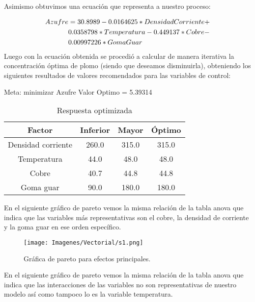 Asimismo obtuvimos una ecuaci\'on que representa a nuestro proceso:

\begin{equation}
 \begin{align}
  Azufre &= 30.8989 - 0.0164625*Densidad Corriente +\\
         &0.0358798*Temperatura - 0.449137*Cobre - \\
         &0.00997226*Goma Guar
               \notag
 \end{align}
\end{equation}
Luego con la ecuaci\'on obtenida se procedi\'o a calcular de manera iterativa la concentraci\'on \'optima de plomo (siendo que deseamos disminuirla), obteniendo los siguientes resultados de valores recomendados para las variables de control:

Meta: minimizar Azufre \phantom{eres un pendejo} Valor Optimo = 5.39314

\begin{table}[H]
\label{tabla16}
\begin{center}
\begin{tabular}{|c|c|c|c|}
\hline
Factor&Inferior&Mayor&\'Optimo\\
\hline
Densidad corriente&260.0&315.0&315.0\\  
\hline
Temperatura&44.0&48.0&48.0\\
\hline
Cobre&40.7&44.8&44.8\\
\hline
Goma guar&90.0&180.0&180.0 \\
\hline
\end{tabular}
\end{center}
\caption{Respuesta optimizada}
\end{table}

En el siguiente gr\'afico de pareto vemos la misma relaci\'on de la tabla anova que indica que las variables m\'as representativas son el cobre, la densidad de corriente y la goma guar en ese orden espec\'ifico. \\

\begin{figure}[H]
 \centering
 \texttt{[image: Imagenes/Vectorial/s1.png]}
 \caption{Gr\'afica de pareto para efectos principales.}
 \label{fig:s1}
\end{figure}

En el siguiente gr\'afico de pareto vemos la misma relaci\'on de la tabla anova que indica que las interacciones de las variables no son representativas de nuestro modelo as\'i como tampoco lo es la variable temperatura.

